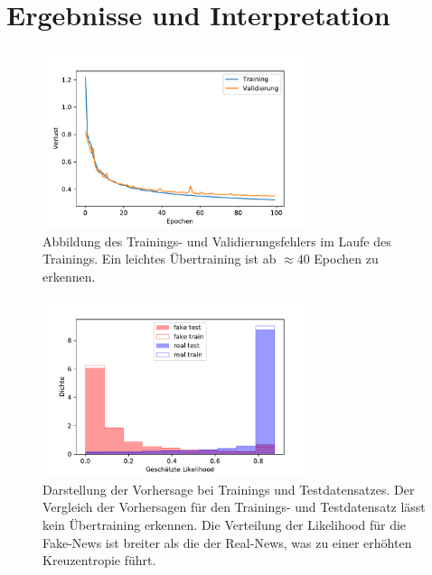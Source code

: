\chapter{Ergebnisse und Interpretation}
\begin{figure}
    \centering
    \includegraphics[width=0.7\textwidth]{pictures/history_bow_best.pdf}
    \caption{Abbildung des Trainings- und Validierungsfehlers im Laufe des Trainings. Ein leichtes Übertraining
            ist ab $\approx 40$ Epochen zu erkennen.}
    \label{fig:history}
\end{figure}
\begin{figure}
    \centering
    \includegraphics[width=0.7\textwidth]{pictures/prob_bow_best_nn.pdf}
    \caption{Darstellung der Vorhersage bei Trainings und Testdatensatzes. Der Vergleich der Vorhersagen für den 
            Trainings- und Testdatensatz lässt kein Übertraining erkennen. Die Verteilung der Likelihood 
            für die Fake-News ist breiter als die der Real-News, was zu einer erhöhten Kreuzentropie führt.}
    \label{fig:probs}
\end{figure}


